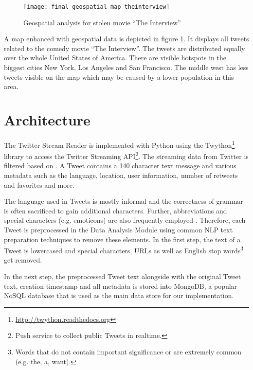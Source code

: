 \begin{figure}[H]
  \centering
        \texttt{[image: final\_geospatial\_map\_theinterview]}
  \caption[Geospatial analysis for stolen movie \enquote{The Interview}]{Geospatial analysis for stolen movie \enquote{The Interview}}
  \label{fig:map-interview}
  \vspace{-1.3em}
\end{figure}

A map enhanced with geospatial data is depicted in figure \ref{fig:map-interview}. It displays all tweets related to the comedy movie \enquote{The Interview}. The tweets are distributed equally over the whole United States of America. There are visible hotspots in the biggest cities New York, Los Angeles and San Francisco. The middle west has less tweets visible on the map which may be caused by a lower population in this area.

\section{Architecture}
\label{sec:architecture}
The Twitter Stream Reader is implemented with Python using the Twython\footnote{\url{http://twython.readthedocs.org} \accessednote} library to access the Twitter Streaming API\footnote{Push service to collect public Tweets in realtime.}. The streaming data from Twitter is filtered based on . A Tweet contains a 140 character text message and various metadata such as the language, location, user information, number of retweets and favorites and more. 

The language used in Tweets is mostly informal and the correctness of grammar is often sacrificed to gain additional characters. Further, abbreviations and special characters (e.g. emoticons) are also frequently employed \cite[67]{TwitterDataAnalytics2013}. Therefore, each Tweet is preprocessed in the Data Analysis Module using common NLP text preparation techniques to remove these elements. In the first step, the text of a Tweet is lowercased and special characters, URLs as well as English stop words\footnote{Words that do not contain important significance or are extremely common (e.g. the, a, want).} get removed.

In the next step, the preprocessed Tweet text alongside with the original Tweet text, creation timestamp and all metadata is stored into MongoDB, a popular NoSQL database that is used as the main data store for our implementation.

